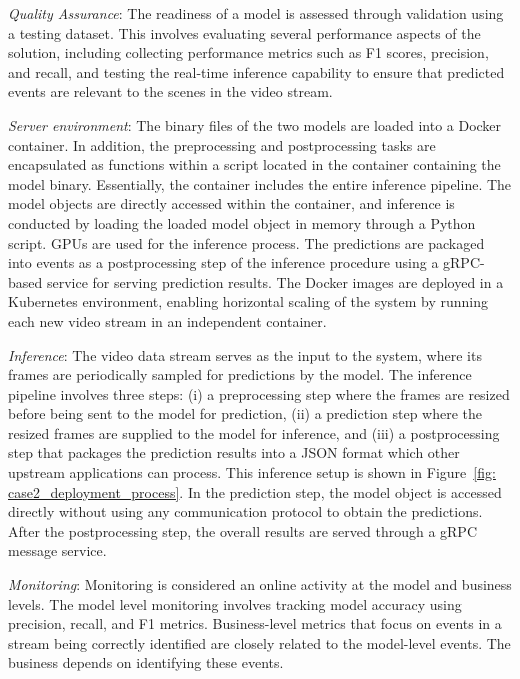 \textit{Quality Assurance}: The readiness of a model is assessed through validation using a testing dataset. This involves evaluating several performance aspects of the solution, including collecting performance metrics such as F1 scores, precision, and recall, and testing the real-time inference capability to ensure that predicted events are relevant to the scenes in the video stream.

\textit{Server environment}: The binary files of the two models are loaded into a Docker container. In addition, the preprocessing and postprocessing tasks are encapsulated as functions within a script located in the container containing the model binary. Essentially, the container includes the entire inference pipeline. The model objects are directly accessed within the container, and inference is conducted by loading the loaded model object in memory through a Python script. GPUs are used for the inference process. The predictions are packaged into events as a postprocessing step of the inference procedure using a gRPC-based service for serving prediction results. The Docker images are deployed in a Kubernetes environment, enabling horizontal scaling of the system by running each new video stream in an independent container. %

\textit{Inference}: The video data stream serves as the input to the system, where its frames are periodically sampled for predictions by the model. The inference pipeline involves three steps: (i) a preprocessing step where the frames are resized before being sent to the model for prediction, (ii) a prediction step where the resized frames are supplied to the model for inference, and (iii) a postprocessing step that packages the prediction results into a JSON format which other upstream applications can process. This inference setup is shown in Figure~\ref{fig: case2_deployment_process}. In the prediction step, the model object is accessed directly without using any communication protocol to obtain the predictions. After the postprocessing step, the overall results are served through a gRPC message service.

\textit{Monitoring}:
Monitoring is considered an online activity at the model and business levels. The model level monitoring involves tracking model accuracy using precision, recall, and F1 metrics. Business-level metrics that focus on events in a stream being correctly identified are closely related to the model-level events. The business depends on identifying these events. %

